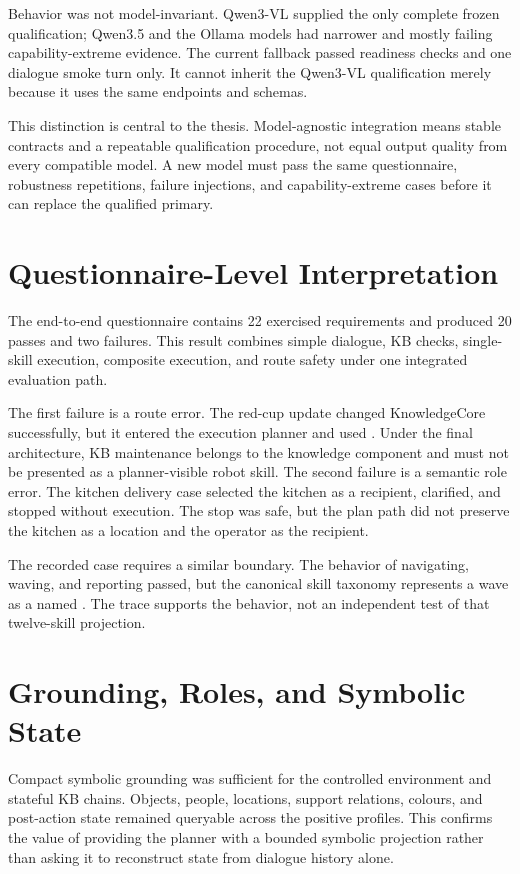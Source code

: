 Behavior was not model-invariant. Qwen3-VL supplied the only complete frozen qualification; Qwen3.5 and the Ollama models had narrower and mostly failing capability-extreme evidence. The current  fallback passed readiness checks and one dialogue smoke turn only. It cannot inherit the Qwen3-VL qualification merely because it uses the same endpoints and schemas.

This distinction is central to the thesis. Model-agnostic integration means stable contracts and a repeatable qualification procedure, not equal output quality from every compatible model. A new model must pass the same questionnaire, robustness repetitions, failure injections, and capability-extreme cases before it can replace the qualified primary.

\section{Questionnaire-Level Interpretation}

The end-to-end questionnaire contains 22 exercised requirements and produced 20 passes and two failures. This result combines simple dialogue, KB checks, single-skill execution, composite execution, and route safety under one integrated evaluation path.

The first failure is a route error. The red-cup update changed KnowledgeCore successfully, but it entered the execution planner and used . Under the final architecture, KB maintenance belongs to the knowledge component and must not be presented as a planner-visible robot skill. The second failure is a semantic role error. The kitchen delivery case selected the kitchen as a recipient, clarified, and stopped without execution. The stop was safe, but the plan path did not preserve the kitchen as a location and the operator as the recipient.

The recorded  case requires a similar boundary. The behavior of navigating, waving, and reporting passed, but the canonical skill taxonomy represents a wave as a named . The trace supports the behavior, not an independent test of that twelve-skill projection.

\section{Grounding, Roles, and Symbolic State}

Compact symbolic grounding was sufficient for the controlled environment and stateful KB chains. Objects, people, locations, support relations, colours, and post-action state remained queryable across the positive profiles. This confirms the value of providing the planner with a bounded symbolic projection rather than asking it to reconstruct state from dialogue history alone.

